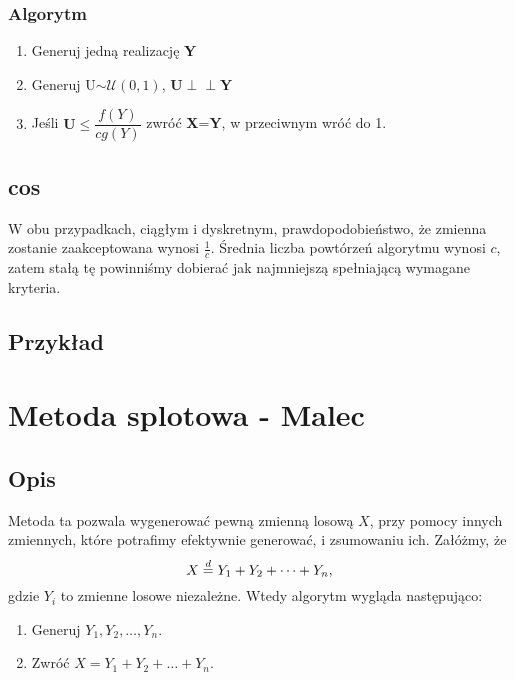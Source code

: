 \documentclass[12pt]{mwrep}
\newcommand{\indep}{\perp \!\!\! \perp}
\begin{document}
	\subsubsection{Algorytm}
	\begin{enumerate}[leftmargin=10mm]
		\item Generuj jedną realizację \textbf{Y}
		\item Generuj U$\sim \mathcal{U}(0,1)$, $\textbf{U}\boldsymbol{\indep} \textbf{Y}$
		\item Jeśli $\textbf{U}\leqslant\dfrac{f(Y)}{cg(Y)}$ zwróć \textbf{X}=\textbf{Y}, w przeciwnym wróć do 1.
	\end{enumerate}

	\subsection{cos}
	W obu przypadkach, ciągłym i dyskretnym, prawdopodobieństwo, że zmienna zostanie zaakceptowana wynosi $\frac{1}{c}$. Średnia liczba powtórzeń algorytmu wynosi $c$, zatem stałą tę powinniśmy dobierać jak najmniejszą spełniającą wymagane kryteria.

	\subsection{Przykład}


	
	\section{Metoda splotowa - Malec}
	\subsection{Opis}
	\noindent Metoda ta pozwala wygenerować pewną zmienną losową $X$, przy pomocy innych zmiennych, które potrafimy efektywnie generować, i zsumowaniu ich. Załóżmy, że
	$$ X \buildrel{d} \over{=} Y_1 + Y_2 + \dots + Y_n, $$
	gdzie $Y_i$ to zmienne losowe niezależne. Wtedy algorytm wygląda następująco:
	\begin{enumerate}
		\item Generuj $ Y_1, Y_2, \dots, Y_n $.
		\item Zwróć $ X = Y_1 + Y_2 + \dots + Y_n $.
	\end{enumerate}
\end{document}
